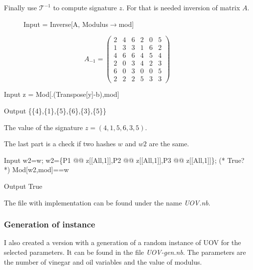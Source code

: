 \documentclass[thesis=M,english]{FITthesis}[2019/12/23]
\begin{document}
\bigskip
\noindent
Finally use $\mathcal{T}^{-1}$ to compute signature $z$. For that is needed inversion of matrix $A$.
\begin{figure}[h]
\begin{minipage}{0.59\textwidth}
\centering
\begin{mmaCell}[moredefined={A, mod}]{Input}
 = Inverse[A, Modulus\(\pmb{\to}\)mod]
\end{mmaCell}
\end{minipage}
\begin{minipage}{0.28\textwidth}
\centering
\begin{equation*}
A_{-1} =
\begin{pmatrix}
2 & 4 & 6 & 2 & 0 & 5 \\
1 & 3 & 3 & 1 & 6 & 2 \\
4 & 6 & 6 & 4 & 5 & 4 \\
2 & 0 & 3 & 4 & 2 & 3 \\
6 & 0 & 3 & 0 & 0 & 5 \\
2 & 2 & 2 & 5 & 3 & 3
\end{pmatrix}
\end{equation*}
\end{minipage}
\end{figure}
\begin{mmaCell}[moredefined={z, A, y, b, mod}]{Input}
z = Mod[.(Transpose[y]-b),mod]
\end{mmaCell}
\begin{mmaCell}{Output}
\{\{4\},\{1\},\{5\},\{6\},\{3\},\{5\}\}
\end{mmaCell}
The value of the signature $z = (4,1,5,6,3,5)$.

\bigskip
\noindent
The last part is a check if two hashes $w$ and $w2$ are the same.
\begin{mmaCell}[moredefined={w2, w, P1, z, P2, P3, mod}]{Input}
w2=w;
w2=\{P1 @@ z[[All,1]],P2 @@ z[[All,1]],P3 @@ z[[All,1]]\};
(* True? *)
Mod[w2,mod]==w
\end{mmaCell}
\begin{mmaCell}[addtoindex=2]{Output}
True
\end{mmaCell}
The file with implementation can be found under the name \textit{UOV.nb}.

\subsubsection{Generation of instance}
I also created a version with a generation of a random instance of UOV for the selected parameters. It can be found in the file \textit{UOV-gen.nb}. The parameters are the number of vinegar and oil variables and the value of modulus.
\end{document}
